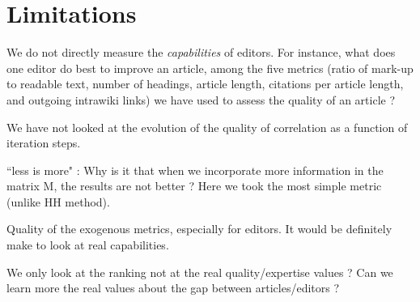 \section{Limitations}

We do not directly measure the {\it capabilities} of editors. For instance, what does one editor do best to improve an article, among the five metrics (ratio of mark-up to readable text, number of headings, article length, citations per article length, and outgoing intrawiki links) we have used to assess the quality of an article ? 

We have not looked at the evolution of the quality of correlation as a function of iteration steps.

``less is more" : Why is it that when we incorporate more information in the matrix M, the results are not better ? Here we took the most simple metric (unlike HH method).

Quality of the exogenous metrics, especially for editors. It would be definitely make to look at real capabilities.

We only look at the ranking not at the real quality/expertise values ? Can we learn more the real values about the gap between articles/editors ?

